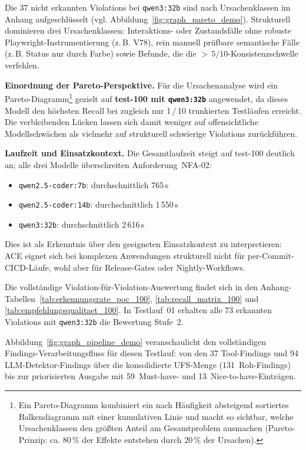 Die 37 nicht erkannten Violations bei \texttt{qwen3:32b} sind nach Ursachenklassen im Anhang aufgeschlüsselt (vgl. Abbildung~\ref{fig:graph_pareto_demo}). Strukturell dominieren drei Ursachenklassen: Interaktions- oder Zustandsfälle ohne robuste Playwright-Instrumentierung (z.\,B. V78), rein manuell prüfbare semantische Fälle (z.\,B. Status nur durch Farbe) sowie Befunde, die die $>\,5/10$-Konsistenzschwelle verfehlen.

\textbf{Einordnung der Pareto-Perspektive.}
Für die Ursachenanalyse wird ein Pareto-Diagramm\footnote{Ein Pareto-Diagramm kombiniert ein nach Häufigkeit absteigend sortiertes Balkendiagramm mit einer kumulativen Linie und macht so sichtbar, welche Ursachenklassen den größten Anteil am Gesamtproblem ausmachen (Pareto-Prinzip: ca. 80\,\% der Effekte entstehen durch 20\,\% der Ursachen).} gezielt auf \textbf{test-100 mit \texttt{qwen3:32b}} angewendet, da dieses Modell den höchsten Recall bei zugleich nur 1\,/\,10 trunkierten Testläufen erreicht. Die verbleibenden Lücken lassen sich damit weniger auf offensichtliche Modellschwächen als vielmehr auf strukturell schwierige Violations zurückführen.

\textbf{Laufzeit und Einsatzkontext.}
Die Gesamtlaufzeit steigt auf test-100 deutlich an; alle drei Modelle überschreiten Anforderung~\ac{NFA}-02:
\begin{itemize}
  \item \texttt{qwen2.5-coder:7b}: durchschnittlich 765\,s
  \item \texttt{qwen2.5-coder:14b}: durchschnittlich 1\,550\,s
  \item \texttt{qwen3:32b}: durchschnittlich 2\,616\,s
\end{itemize}
Dies ist als Erkenntnis über den geeigneten Einsatzkontext zu interpretieren: \ac{ACE} eignet sich bei komplexen Anwendungen strukturell nicht für per-Commit-\ac{CICD}-Läufe, wohl aber für Release-Gates oder Nightly-Workflows.

Die vollständige Violation-für-Violation-Auswertung findet sich in den Anhang-Tabellen~\ref{tab:erkennungsrate_poc_100}, \ref{tab:recall_matrix_100} und \ref{tab:empfehlungsqualitaet_100}. In Testlauf~01 erhalten alle 73 erkannten Violations mit \texttt{qwen3:32b} die Bewertung Stufe~2.

Abbildung~\ref{fig:graph_pipeline_demo} veranschaulicht den vollständigen Findings-Verarbeitungsfluss für diesen Testlauf: von den 37 Tool-Findings und 94 \ac{LLM}-Detektor-Findings über die konsolidierte \ac{UFS}-Menge (131~Roh-Findings) bis zur priorisierten Ausgabe mit 59~Must-have- und 13~Nice-to-have-Einträgen.

